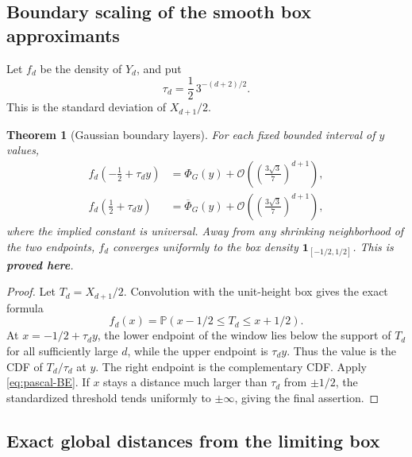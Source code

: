 \documentclass[11pt,oneside]{article}
\numberwithin{equation}{section}
\newtheorem{theorem}{Theorem}[section]
\theoremstyle{definition}
\theoremstyle{remark}
\newcommand{\Prob}{\mathbb P}
\newcommand{\bigO}{\mathcal O}
\newcommand{\statusproved}{\textcolor{deepgreen}{\textbf{proved here}}}
\newcommand{\NormalCDF}{\Phi_{\!G}}
\newcommand{\NormalSurv}{\overline{\Phi}_{\!G}}
\begin{document}
\subsection{Boundary scaling of the smooth box approximants}

Let $f_d$ be the density of $Y_d$, and put
\begin{equation}
 \tau_d=\frac12\,3^{-(d+2)/2}.
 \label{eq:tau-d}
\end{equation}
This is the standard deviation of $X_{d+1}/2$.

\begin{theorem}[Gaussian boundary layers]
\label{thm:boundary-layer}
For each fixed bounded interval of $y$ values,
\begin{align}
 f_d\!\left(-\frac12+\tau_dy\right)
 &=\NormalCDF(y)+
   \bigO\!\left(\left(\frac{3\sqrt3}{7}\right)^{d+1}\right),
 \label{eq:left-boundary}\\
 f_d\!\left(\frac12+\tau_dy\right)
 &=\NormalSurv(y)+
   \bigO\!\left(\left(\frac{3\sqrt3}{7}\right)^{d+1}\right),
 \label{eq:right-boundary}
\end{align}
where the implied constant is universal.  Away from any shrinking neighborhood of the two
endpoints, $f_d$ converges uniformly to the box density
$\mathbf1_{[-1/2,1/2]}$.  This is \statusproved.
\end{theorem}

\begin{proof}
Let $T_d=X_{d+1}/2$.  Convolution with the unit-height box gives the exact formula
\begin{equation}
 f_d(x)=\Prob(x-1/2\le T_d\le x+1/2).
 \label{eq:fd-window}
\end{equation}
At $x=-1/2+\tau_dy$, the lower endpoint of the window lies below the support of $T_d$ for
all sufficiently large $d$, while the upper endpoint is $\tau_dy$.  Thus the value is the
CDF of $T_d/\tau_d$ at $y$.  The right endpoint is the complementary CDF.  Apply
\eqref{eq:pascal-BE}.  If $x$ stays a distance much larger than $\tau_d$ from
$\pm1/2$, the standardized threshold tends uniformly to $\pm\infty$, giving the final
assertion.
\end{proof}

\subsection{Exact global distances from the limiting box}
\end{document}
